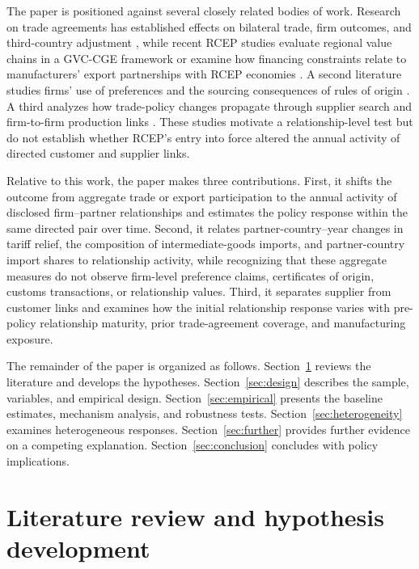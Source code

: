 \documentclass[preprint,12pt,authoryear]{elsarticle}
\begin{document}
The paper is positioned against several closely related bodies of work. Research on trade agreements has established effects on bilateral trade, firm outcomes, and third-country adjustment \citep{baier2007free,sun2022rtaquality,lee2023thirdcountry}, while recent RCEP studies evaluate regional value chains in a GVC-CGE framework \citep{sun2023estimating} or examine how financing constraints relate to manufacturers' export partnerships with RCEP economies \citep{peng2025financing}. A second literature studies firms' use of preferences and the sourcing consequences of rules of origin \citep{hayakawa2023firm,tanaka2022rooexports,head2024laffer}. A third analyzes how trade-policy changes propagate through supplier search and firm-to-firm production links \citep{garg2023within,grossman2024tariffs}. These studies motivate a relationship-level test but do not establish whether RCEP's entry into force altered the annual activity of directed customer and supplier links.

Relative to this work, the paper makes three contributions. First, it shifts the outcome from aggregate trade or export participation to the annual activity of disclosed firm--partner relationships and estimates the policy response within the same directed pair over time. Second, it relates partner-country--year changes in tariff relief, the composition of intermediate-goods imports, and partner-country import shares to relationship activity, while recognizing that these aggregate measures do not observe firm-level preference claims, certificates of origin, customs transactions, or relationship values. Third, it separates supplier from customer links and examines how the initial relationship response varies with pre-policy relationship maturity, prior trade-agreement coverage, and manufacturing exposure.

The remainder of the paper is organized as follows. Section~\ref{sec:theory} reviews the literature and develops the hypotheses. Section~\ref{sec:design} describes the sample, variables, and empirical design. Section~\ref{sec:empirical} presents the baseline estimates, mechanism analysis, and robustness tests. Section~\ref{sec:heterogeneity} examines heterogeneous responses. Section~\ref{sec:further} provides further evidence on a competing explanation. Section~\ref{sec:conclusion} concludes with policy implications.

\section{Literature review and hypothesis development}
\label{sec:theory}
\end{document}
